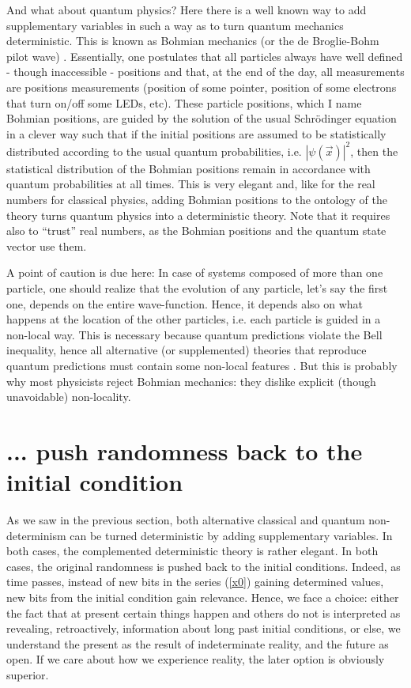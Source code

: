 \documentclass[pra,aps,groupedaddress,twocolumn,floatfix,nofootinbib]{revtex4}
\begin{document}
And what about quantum physics? Here there is a well known way to add supplementary variables in such a way as to turn quantum mechanics deterministic. This is known as Bohmian mechanics (or the de Broglie-Bohm pilot wave) \cite{Bohm52,BellBohm,DurrTeufel}. Essentially, one postulates that all particles always have well defined - though inaccessible - positions and that, at the end of the day, all measurements are positions measurements (position of some pointer, position of some electrons that turn on/off some LEDs, etc). These particle positions, which I name Bohmian positions, are guided by the solution of the usual Schr\"odinger equation in a clever way such that if the initial positions are assumed to be statistically distributed according to the usual quantum probabilities, i.e. $|\psi(\vec x)|^2$, then the statistical distribution of the Bohmian positions remain in accordance with quantum probabilities at all times. This is very elegant and, like for the real numbers for classical physics, adding Bohmian positions to the ontology of the theory turns quantum physics into a deterministic theory. Note that it requires also to ``trust'' real numbers, as the Bohmian positions and the quantum state vector use them. 

A point of caution is due here: In case of systems composed of more than one particle, one should realize that the evolution of any particle, let's say the first one, depends on the entire wave-function. Hence, it depends also on what happens at the location of the other particles, i.e. each particle is guided in a non-local way. This is necessary because quantum predictions violate the Bell inequality, hence all alternative (or supplemented) theories that reproduce quantum predictions must contain some non-local features \cite{Bellspeakable, BrunnerRMP14, GisinQchance14}. But this is probably why most physicists reject Bohmian mechanics: they dislike explicit (though unavoidable) non-locality.


\section{... push randomness back to the initial condition}\label{suppvar2}
As we saw in the previous section, both alternative classical and quantum non-determinism can be turned deterministic by adding supplementary variables. In both cases, the complemented deterministic theory is rather elegant. In both cases, the original randomness is pushed back to the initial conditions. 
Indeed, as time passes, instead of new bits in the series (\ref{x0}) gaining determined values, new bits from the initial condition gain relevance. Hence, we face a choice: either the fact that at present certain things happen and others do not is interpreted as revealing, retroactively, information about long past initial conditions, or else, we understand the present as the result of indeterminate reality, and the future as open. If we care about how we experience reality, the later option is obviously superior.   
\end{document}

